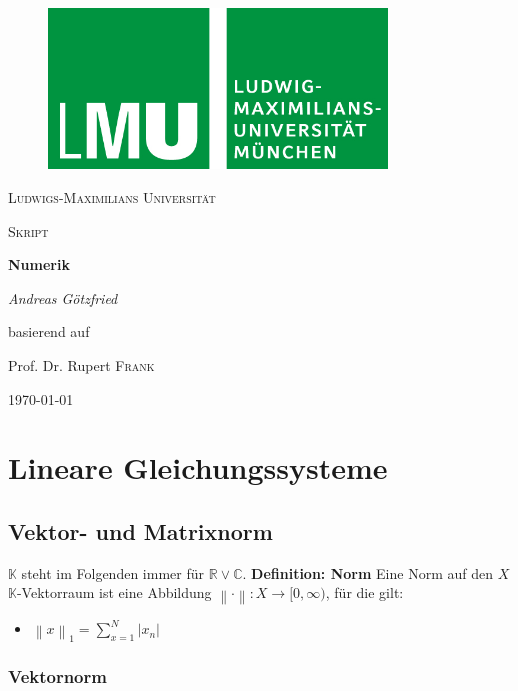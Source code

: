 \documentclass{article}
\newcommand\norm[1]{\left\lVert#1\right\rVert}
\begin{document}
\begin{titlepage}
\centering
    \begin{figure}
    \centering
	    \includegraphics[width=90mm]{logo_lmu.jpg}
    \end{figure}
	{\scshape\LARGE Ludwigs-Maximilians Universität \par}
	\vspace{1cm}
	{\scshape\Large Skript \par}
	\vspace{1.5cm}
	{\huge\bfseries Numerik\par}
	\vspace{2cm}
	{\Large\itshape Andreas Götzfried\par}
    \vfill
	    basierend auf\par
	    Prof. Dr. Rupert \textsc{Frank}
    \vfill
	{\large \today\par}
\end{titlepage}
\tableofcontents{}

\newpage
\section{Lineare Gleichungssysteme}
\subsection{Vektor- und Matrixnorm}
    $\mathbb{K}$ steht im Folgenden immer für $\mathbb{R}\vee\mathbb{C}$.\newline
    \textbf{Definition: Norm}\newline
    Eine Norm auf den $X$ $\mathbb{K}$-Vektorraum ist eine Abbildung 
    $\norm{\cdot}:X\rightarrow[0,\infty)$, für die gilt:
    \begin{itemize}
        \item $\norm{x}_1=\sum_{x=1}^N|x_n|$
    \end{itemize}
\subsubsection{Vektornorm}
\end{document}
